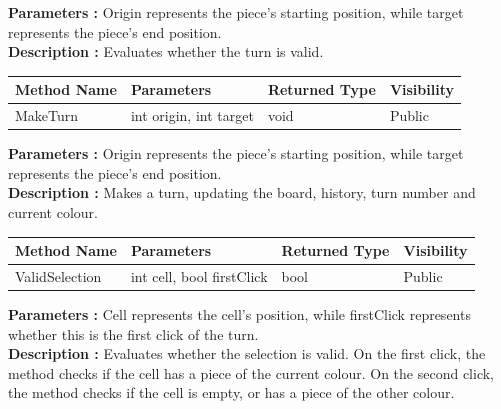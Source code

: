 \documentclass[12pt]{article}
\begin{document}
    \textbf{Parameters :} Origin represents the piece's starting position, while target represents the piece's end position.
    \\

    \textbf{Description :} Evaluates whether the turn is valid.

    \begin{table}[H]
        \begin{tabular}{|l|l|l|l|}
            \hline
            \rowcolor[HTML]{EFEFEF}
            \cellcolor[HTML]{EFEFEF}\textbf{Method Name} & \textbf{Parameters}    & \textbf{Returned Type} & \textbf{Visibility} \\ \hline
            MakeTurn                                     & int origin, int target & void                   & Public              \\ \hline
        \end{tabular}
    \end{table}

    \textbf{Parameters :} Origin represents the piece's starting position, while target represents the piece's end position.
    \\

    \textbf{Description :} Makes a turn, updating the board, history, turn number and current colour.

    \begin{table}[H]
        \begin{tabular}{|l|l|l|l|}
            \hline
            \rowcolor[HTML]{EFEFEF}
            \cellcolor[HTML]{EFEFEF}\textbf{Method Name} & \textbf{Parameters}       & \textbf{Returned Type} & \textbf{Visibility} \\ \hline
            ValidSelection                               & int cell, bool firstClick & bool                   & Public              \\ \hline
        \end{tabular}
    \end{table}

    \textbf{Parameters :} Cell represents the cell's position, while firstClick represents whether this is the first click of the turn.
    \\

    \textbf{Description :} Evaluates whether the selection is valid.
    On the first click, the method checks if the cell has a piece of the current colour.
    On the second click, the method checks if the cell is empty, or has a piece of the other colour.
\end{document}

